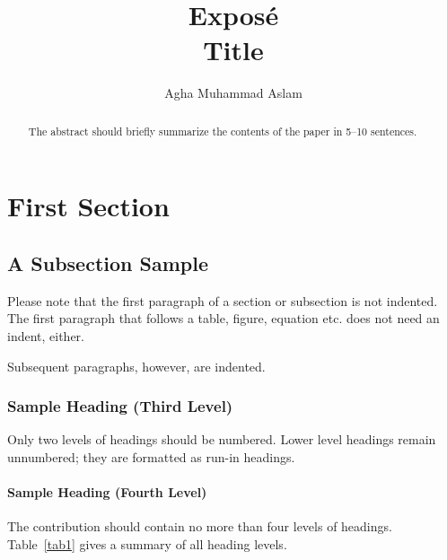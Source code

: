 \documentclass[runningheads]{llncs}
\begin{document}
%
\title{Exposé \\ Title}
%
%
\author{Agha Muhammad Aslam}
%
%
%
\maketitle              %
%
\begin{abstract}
The abstract should briefly summarize the contents of the paper in
5--10 sentences.

\end{abstract}
%
%
%
\section{First Section}
\subsection{A Subsection Sample}
Please note that the first paragraph of a section or subsection is
not indented. The first paragraph that follows a table, figure,
equation etc. does not need an indent, either.

Subsequent paragraphs, however, are indented.

\subsubsection{Sample Heading (Third Level)} Only two levels of
headings should be numbered. Lower level headings remain unnumbered;
they are formatted as run-in headings.

\paragraph{Sample Heading (Fourth Level)}
The contribution should contain no more than four levels of
headings. Table~\ref{tab1} gives a summary of all heading levels.
\end{document}

